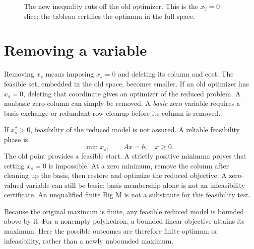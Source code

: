 \documentclass[11pt,a4paper]{article}
\begin{document}
\begin{figure}[H]\centering
  \caption{The new inequality cuts off the old optimizer.
    This is the $x_2=0$ slice; the tableau certifies the optimum in the full space.}
\end{figure}

\section{Removing a variable}\label{sec:delete-variable}
Removing $x_s$ means imposing $x_s=0$ and deleting its column and cost.
The feasible set, embedded in the old space, becomes smaller.
If an old optimizer has $x_s=0$, deleting that coordinate gives an optimizer
of the reduced problem. A nonbasic zero column can simply be removed.
A \emph{basic} zero variable requires a basis exchange or redundant-row
cleanup before its column is removed.

If $x_s^*>0$, feasibility of the reduced model is not assured.
A reliable feasibility phase is
\[
  \min x_s,\qquad Ax=b,\quad x\geq0.
\]
The old point provides a feasible start. A strictly positive minimum proves
that setting $x_s=0$ is impossible. At a zero minimum, remove the column after
cleaning up the basis, then restore and optimize the reduced objective.
A zero-valued variable can still be basic: basis membership alone is not an
infeasibility certificate. An unqualified finite Big M is not a substitute
for this feasibility test.

Because the original maximum is finite, any feasible reduced model is bounded
above by it. For a nonempty polyhedron, a bounded linear objective attains its
maximum. Here the possible outcomes are therefore finite optimum or
infeasibility, rather than a newly unbounded maximum.
\end{document}
